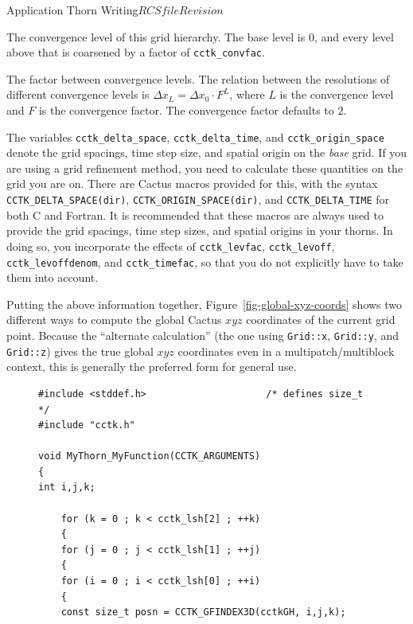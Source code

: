 \begin{cactuspart}{Application Thorn Writing}{$RCSfile$}{$Revision$}
\begin{Lentry}
\item [\texttt{cctk\_convlevel}] The convergence level of this grid hierarchy.
        The base level is $0$, and every level above that is
        coarsened by a factor of \texttt{cctk\_convfac}.
\item [\texttt{cctk\_convfac}] The factor between convergence levels.
        The relation between the resolutions of different convergence
        levels is $\Delta x_L = \Delta x_0 \cdot F^L$, where $L$ is the
        convergence level and $F$ is the convergence factor.
        The convergence factor defaults to $2$.
\end{Lentry}

The variables \texttt{cctk\_delta\_space}, \texttt{cctk\_delta\_time}, and
\texttt{cctk\_origin\_space} denote the grid spacings, time step size,
and spatial origin on the \textit{base} grid.  If you are using a grid
refinement method, you need to calculate these quantities on the grid
you are on.  There are Cactus macros provided for this, with the
syntax \texttt{CCTK\_DELTA\_SPACE(dir)}, \texttt{CCTK\_ORIGIN\_SPACE(dir)},
and \texttt{CCTK\_DELTA\_TIME} for both C and Fortran.  It is recommended
that these macros are always used to provide the grid spacings, time
step sizes, and spatial origins in your thorns.  In doing so, you
incorporate the effects of \texttt{cctk\_levfac}, \texttt{cctk\_levoff},
\texttt{cctk\_levoffdenom}, and \texttt{cctk\_timefac}, so that you do not
explicitly have to take them into account.

Putting the above information together, Figure~\ref{fig-global-xyz-coords}
shows two different ways to compute the global Cactus $xyz$ coordinates
of the current grid point.  Because the ``alternate calculation'' (the
one using \verb|Grid::x|, \verb|Grid::y|, and \verb|Grid::z|) gives the
true global $xyz$ coordinates even in a multipatch/multiblock context,
this is generally the preferred form for general use.

\begin{figure}[bp]
\begin{verbatim}
#include <stddef.h>                     /* defines size_t */
#include "cctk.h"

void MyThorn_MyFunction(CCTK_ARGUMENTS)
{
int i,j,k;

    for (k = 0 ; k < cctk_lsh[2] ; ++k)
    {
    for (j = 0 ; j < cctk_lsh[1] ; ++j)
    {
    for (i = 0 ; i < cctk_lsh[0] ; ++i)
    {
    const size_t posn = CCTK_GFINDEX3D(cctkGH, i,j,k);


\end{verbatim}
\end{figure}
\end{cactuspart}
